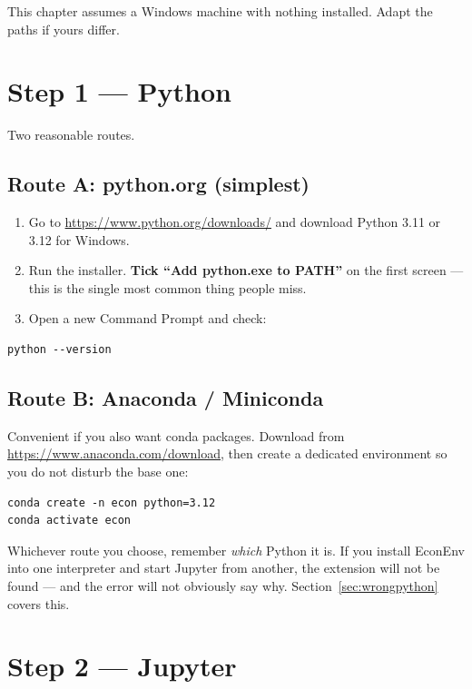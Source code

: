 \documentclass[11pt,a4paper]{report}
\begin{document}
This chapter assumes a Windows machine with nothing installed. Adapt the paths
if yours differ.

\section{Step 1 --- Python}

Two reasonable routes.

\subsection*{Route A: python.org (simplest)}

\begin{enumerate}
  \item Go to \url{https://www.python.org/downloads/} and download Python 3.11
        or 3.12 for Windows.
  \item Run the installer. \textbf{Tick ``Add python.exe to PATH''} on the first
        screen --- this is the single most common thing people miss.
  \item Open a new Command Prompt and check:
\end{enumerate}

\begin{lstlisting}
python --version
\end{lstlisting}

\subsection*{Route B: Anaconda / Miniconda}

Convenient if you also want conda packages. Download from
\url{https://www.anaconda.com/download}, then create a dedicated environment so
you do not disturb the base one:

\begin{lstlisting}
conda create -n econ python=3.12
conda activate econ
\end{lstlisting}

\begin{note}
Whichever route you choose, remember \emph{which} Python it is. If you install
EconEnv into one interpreter and start Jupyter from another, the extension will
not be found --- and the error will not obviously say why. Section~\ref{sec:wrongpython}
covers this.
\end{note}

\section{Step 2 --- Jupyter}
\end{document}
